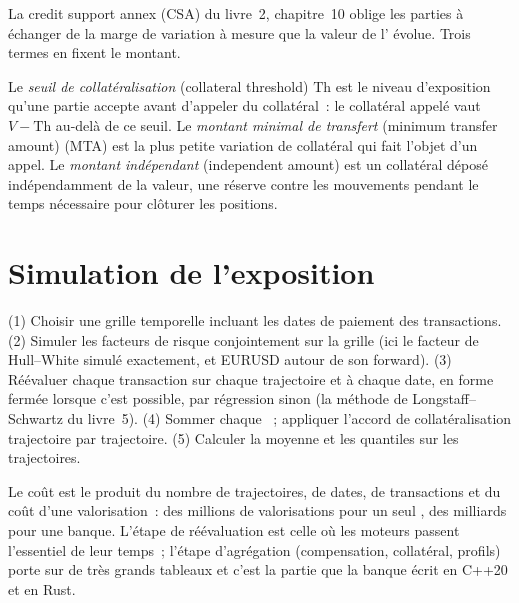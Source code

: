 La credit support annex (CSA) du livre~2, chapitre~10 oblige les parties à échanger
de la marge de variation à mesure que la valeur de l' évolue. Trois termes en fixent le montant.

\begin{definition}\label{def:rc:counterparty-exposure:csa}
Le \emph{seuil de collatéralisation} (collateral threshold) $\mathrm{Th}$ est le niveau d'exposition
qu'une partie accepte avant d'appeler du collatéral~: le collatéral appelé vaut $V-\mathrm{Th}$ au-delà de ce seuil. Le
\emph{montant minimal de transfert} (minimum transfer amount) (MTA) est la plus petite variation
de collatéral qui fait l'objet d'un appel. Le \emph{montant indépendant} (independent amount) est
un collatéral déposé indépendamment de la valeur, une réserve contre les mouvements pendant le temps nécessaire
pour clôturer les positions.
\end{definition}

\section{Simulation de l'exposition}

\begin{method}\label{met:rc:counterparty-exposure:sim}
(1) Choisir une grille temporelle incluant les dates de paiement des transactions. (2) Simuler les facteurs
de risque conjointement sur la grille (ici le facteur de Hull--White simulé exactement, et EURUSD autour de son
forward). (3) Réévaluer chaque transaction sur chaque trajectoire et à chaque date, en forme fermée lorsque c'est possible, par
régression sinon (la méthode de Longstaff--Schwartz du livre~5). (4) Sommer chaque
~; appliquer l'accord de collatéralisation trajectoire par trajectoire. (5) Calculer la moyenne et les quantiles
sur les trajectoires.
\end{method}

\label{lst:rc:counterparty-exposure:sim}

Le coût est le produit du nombre de trajectoires, de dates, de transactions et du coût d'une valorisation~: des millions de
valorisations pour un seul , des milliards pour une banque. L'étape de réévaluation est celle où
les moteurs passent l'essentiel de leur temps~; l'étape d'agrégation (compensation, collatéral, profils) porte sur
de très grands tableaux et c'est la partie que la banque écrit en C++20 et en Rust.


